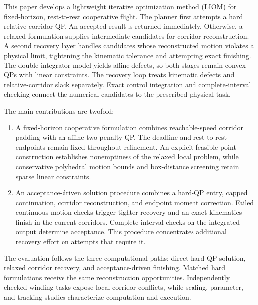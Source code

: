 This paper develops a lightweight iterative optimization method (LIOM) for fixed-horizon, rest-to-rest cooperative flight. The planner first attempts a hard relative-corridor QP. An accepted result is returned immediately. Otherwise, a relaxed formulation supplies intermediate candidates for corridor reconstruction. A second recovery layer handles candidates whose reconstructed motion violates a physical limit, tightening the kinematic tolerance and attempting exact finishing. The double-integrator model yields affine defects, so both stages remain convex QPs with linear constraints. The recovery loop treats kinematic defects and relative-corridor slack separately. Exact control integration and complete-interval checking connect the numerical candidates to the prescribed physical task.

The main contributions are twofold:
\begin{enumerate}
\item A fixed-horizon cooperative formulation combines reachable-speed corridor padding with an affine two-penalty QP. The deadline and rest-to-rest endpoints remain fixed throughout refinement. An explicit feasible-point construction establishes nonemptiness of the relaxed local problem, while conservative polyhedral motion bounds and box-distance screening retain sparse linear constraints.
\item An acceptance-driven solution procedure combines a hard-QP entry, capped continuation, corridor reconstruction, and endpoint moment correction. Failed continuous-motion checks trigger tighter recovery and an exact-kinematics finish in the current corridors. Complete-interval checks on the integrated output determine acceptance. This procedure concentrates additional recovery effort on attempts that require it.
\end{enumerate}
The evaluation follows the three computational paths: direct hard-QP solution, relaxed corridor recovery, and acceptance-driven finishing. Matched hard formulations receive the same reconstruction opportunities. Independently checked winding tasks expose local corridor conflicts, while scaling, parameter, and tracking studies characterize computation and execution.
